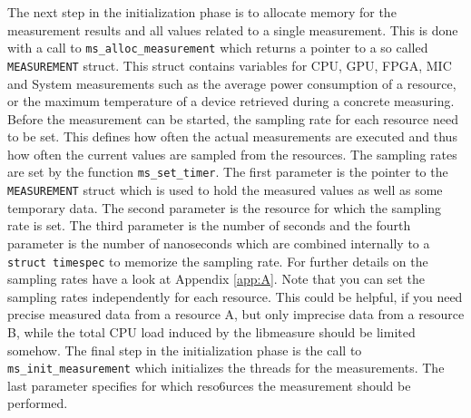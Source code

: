 The next step in the initialization phase is to allocate memory for the measurement results and all values related to a single measurement. This is done with a call to \texttt{ms\_alloc\_measurement} which returns a pointer to a so called \texttt{MEASUREMENT} struct. This struct contains variables for CPU, GPU, FPGA, MIC and System measurements such as the average power consumption of a resource, or the maximum temperature of a device retrieved during a concrete measuring.
Before the measurement can be started, the sampling rate for each resource need to be set. This defines how often the actual measurements are executed and thus how often the current values are sampled from the resources. The sampling rates are set by the function \texttt{ms\_set\_timer}. The first parameter is the pointer to the \texttt{MEASUREMENT} struct which is used to hold the measured values as well as some temporary data. The second parameter is the resource for which the sampling rate is set. The third parameter is the number of seconds and the fourth parameter is the number of nanoseconds which are combined internally to a \texttt{struct timespec} to memorize the sampling rate.    For further details on the sampling rates have a look at Appendix \ref{app:A}. Note that you can set the sampling rates independently for each resource. This could be helpful, if you need precise measured data from a resource A, but only imprecise data from a resource B, while the total CPU load induced by the libmeasure should be limited somehow. The final step in the initialization phase is the call to \texttt{ms\_init\_measurement} which initializes the threads for the measurements. The last parameter specifies for which reso6urces the measurement should be performed.\\

